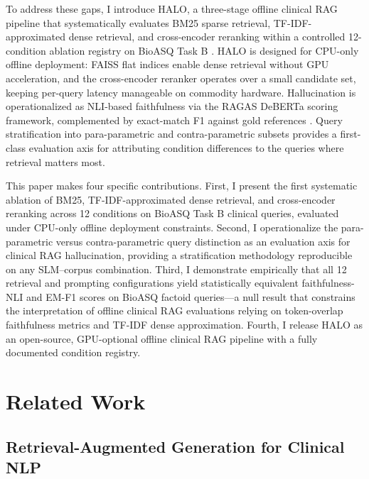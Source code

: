 \documentclass{article}
\begin{document}
To address these gaps, I introduce HALO, a three-stage offline clinical RAG pipeline that systematically evaluates BM25 sparse retrieval, TF-IDF-approximated dense retrieval, and cross-encoder reranking within a controlled 12-condition ablation registry on BioASQ Task B \cite{tsatsaronis2015overview}. HALO is designed for CPU-only offline deployment: FAISS flat indices enable dense retrieval without GPU acceleration, and the cross-encoder reranker operates over a small candidate set, keeping per-query latency manageable on commodity hardware. Hallucination is operationalized as NLI-based faithfulness via the RAGAS DeBERTa scoring framework, complemented by exact-match F1 against gold references \cite{es2023ragas}. Query stratification into para-parametric and contra-parametric subsets provides a first-class evaluation axis for attributing condition differences to the queries where retrieval matters most.

This paper makes four specific contributions. First, I present the first systematic ablation of BM25, TF-IDF-approximated dense retrieval, and cross-encoder reranking across 12 conditions on BioASQ Task B clinical queries, evaluated under CPU-only offline deployment constraints. Second, I operationalize the para-parametric versus contra-parametric query distinction as an evaluation axis for clinical RAG hallucination, providing a stratification methodology reproducible on any SLM--corpus combination. Third, I demonstrate empirically that all 12 retrieval and prompting configurations yield statistically equivalent faithfulness-NLI and EM-F1 scores on BioASQ factoid queries---a null result that constrains the interpretation of offline clinical RAG evaluations relying on token-overlap faithfulness metrics and TF-IDF dense approximation. Fourth, I release HALO as an open-source, GPU-optional offline clinical RAG pipeline with a fully documented condition registry.

\section{Related Work}

\label{sec:related_work}

\subsection{Retrieval-Augmented Generation for Clinical NLP}

\label{sec:retrieval_augmented_generation_for_clini}
\end{document}
